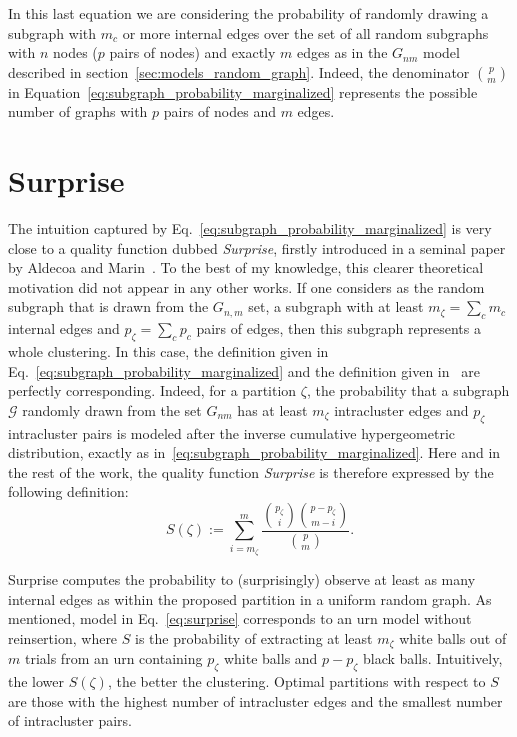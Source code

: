 In this last equation we are considering the probability of randomly drawing a subgraph with $m_c$ or more internal edges over the set of all random subgraphs with $n$ nodes ($p$ pairs of nodes) and exactly $m$ edges as in the $G_{nm}$ model described in section~\ref{sec:models_random_graph}. Indeed, the denominator $\binom{p}{m}$ in Equation~\ref{eq:subgraph_probability_marginalized} represents the possible number of graphs with $p$ pairs of nodes and $m$ edges. 

\section{Surprise}
The intuition captured by Eq.~\ref{eq:subgraph_probability_marginalized} is very close to a quality function dubbed \emph{Surprise}, firstly introduced in a seminal paper by Aldecoa and Marin~\cite{aldecoa2011}.
To the best of my knowledge, this clearer theoretical motivation did not appear in any other works.
If one considers as the random subgraph that is drawn from the $G_{n,m}$ set, a subgraph with at least $m_\zeta=\sum_c m_c$ internal edges and $p_\zeta=\sum_c p_c$ pairs of edges, then this subgraph represents a whole clustering.
In this case, the definition given in Eq.~\ref{eq:subgraph_probability_marginalized} and the definition given in~\cite{aldecoa2011} are perfectly corresponding.
Indeed, for a partition $\zeta$, the probability that a subgraph $\mathcal{G}$ randomly drawn from the set $G_{nm}$ has at least $m_\zeta$ intracluster edges and $p_\zeta$ intracluster pairs is modeled after the inverse cumulative hypergeometric distribution, exactly as in~\ref{eq:subgraph_probability_marginalized}.
Here and in the rest of the work, the quality function \emph{Surprise} is therefore expressed by the following definition:
\begin{equation}\label{eq:surprise}
S(\zeta) := \sum_{i = m_\zeta}^m \dfrac{\binom{p_\zeta}{i} \binom{p-p_\zeta}{m-i} }{\binom{p}{m}}.
\end{equation}

Surprise computes the probability to (surprisingly) observe at least as many internal edges as within the proposed partition in a uniform random graph.
As mentioned, model in Eq.~\ref{eq:surprise} corresponds to an urn model without reinsertion, where $S$ is the probability of extracting at least $m_\zeta$ white balls out of $m$ trials from an urn containing $p_\zeta$ white balls and $p-p_\zeta$ black balls.
Intuitively, the lower $S(\zeta)$, the better the clustering. Optimal partitions with respect to $S$ are those with the highest number of intracluster edges and the smallest number of intracluster pairs. 

